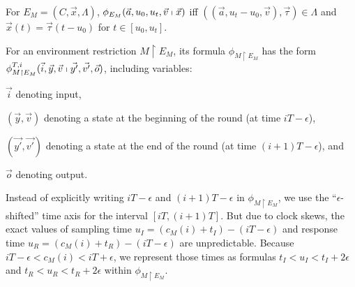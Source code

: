 \begin{definition}
For %
$E_M = (C, \vec{x}, \Lambda)$,
$\phi_{E_M}(\vec{a},u_0,u_t,\vec{v} \shortmid \vec{x})$
iff
$((\vec{a},u_t-u_0,\vec{v}), \vec{\tau}) \in \Lambda$
and $\vec{x}(t) = \vec{\tau}(t - u_0)$ for $t \in [u_0, u_t]$.
\end{definition}



For an environment restriction $M \restriction E_M$,
its formula $\phi_{M \restriction E_M}$ 
has the form
$\phi_{M \restriction E_M}^{T,i}(\vec{i}, \vec{y}, \vec{v} \shortmid \vec{y'}, \vec{v'}, \vec{o})$,
including variables:
\begin{inparaenum}[(i)]
	\item $\vec{i}$ denoting input, 
	\item $(\vec{y},\vec{v})$ denoting a state  at the beginning of the round 
		(at time $iT - \epsilon$),
	\item $(\vec{y'},\vec{v'})$ denoting a state at the end of the round 
		(at time $(i+1)T - \epsilon$), and 
	\item $\vec{o}$ denoting output.
\end{inparaenum}
%
Instead of explicitly writing $iT - \epsilon$ and $(i+1)T - \epsilon$  in $\phi_{M \restriction E_M}$,
we use the ``$\epsilon$-shifted''  time axis for the interval $[iT, (i+1)T]$. %
%
But due to clock skews, 
the exact values of sampling time $u_I = (c_M(i)+t_I)-(iT-\epsilon)$
and response time $u_R = (c_M(i)+t_R)-(iT-\epsilon)$ are unpredictable. 
Because $iT - \epsilon < c_M(i) < iT + \epsilon$,
we represent those times as formulas 
$t_I < u_I < t_I + 2\epsilon$ and $t_R < u_R < t_R + 2\epsilon$
within $\phi_{M \restriction E_M}$.






